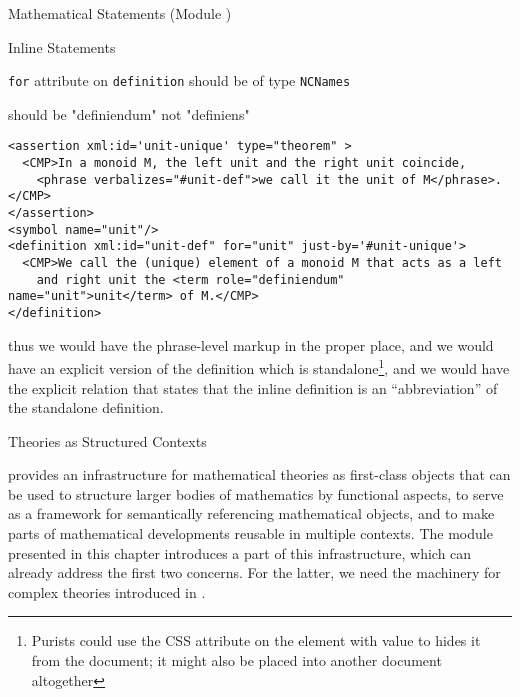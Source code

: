 \begin{tchapter}[id=statements,short=Mathematical Statements]{Mathematical Statements (Module {})}
\begin{tsection}[id=inline-statements]{Inline Statements}
\begin{erratum}[reported-by=Michael Kohlhase,date=2009-08-11]{{\texttt{for}} attribute on
    {\texttt{definition}} should be of type {\texttt{NCNames}}}
\begin{erratum}[reported-by=Krzysztof Retel,date=2006-09-14]{should be "definiendum" not "definiens"}
\begin{lstlisting}[mathescape,caption=An Inline Definition]
<assertion xml:id='unit-unique' type="theorem" >
  <CMP>In a monoid M, the left unit and the right unit coincide,
    <phrase verbalizes="#unit-def">we call it the unit of M</phrase>.</CMP>
</assertion>
<symbol name="unit"/>
<definition xml:id="unit-def" for="unit" just-by='#unit-unique'>
  <CMP>We call the (unique) element of a monoid M that acts as a left 
    and right unit the <term role="definiendum" name="unit">unit</term> of M.</CMP>
</definition>
\end{lstlisting}
\end{erratum}
\end{erratum}
thus we would have the phrase-level markup in the proper place, and we would have an
explicit version of the definition which is standalone\footnote{Purists could use the CSS
  attribute {} on the {} element with
  value {} to hides it from the document; it might also
  be placed into another document altogether}, and we would have the explicit relation
that states that the inline definition is an ``abbreviation'' of the standalone
definition.
\end{tsection}

\begin{tsection}[id=theories]{Theories as Structured Contexts}

  {\omdoc} provides an infrastructure for mathematical theories as first-class objects
  that can be used to structure larger bodies of mathematics by functional aspects, to
  serve as a framework for semantically referencing mathematical objects, and to make
  parts of mathematical developments reusable in multiple contexts. The module
  {} presented in this chapter introduces a part of this infrastructure,
  which can already address the first two concerns. For the latter, we need the machinery
  for complex theories introduced in {}.


\end{tsection}
\end{tchapter}
